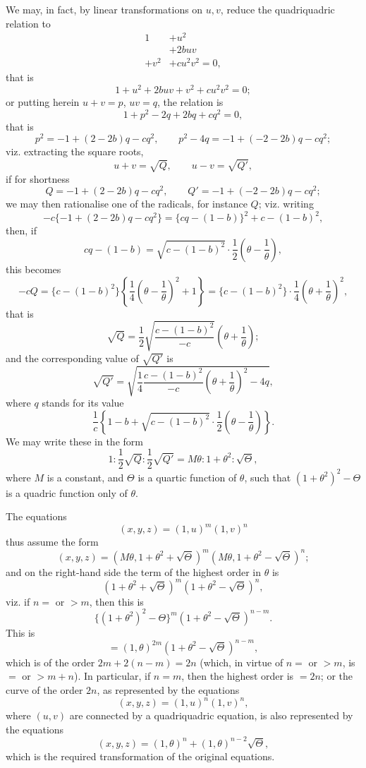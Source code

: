 \documentclass[11pt,a4paper]{article}
\begin{document}
We may, in fact, by linear transformations on $u,v$, reduce the quadriquadric relation to
\[
\begin{matrix}
1&+u^2\\
&+2buv\\
+v^2&+cu^2v^2=0,
\end{matrix}
\]
that is
\[
 1+u^2+2buv+v^2+cu^2v^2=0;
\]
or putting herein $u+v=p$, $uv=q$, the relation is
\[
 1+p^2-2q+2bq+cq^2=0,
\]
that is
\[
 p^2=-1+(2-2b)q-cq^2,\qquad
 p^2-4q=-1+(-2-2b)q-cq^2;
\]
viz. extracting the square roots,
\[
 u+v=\sqrt Q,\qquad u-v=\sqrt{Q'},
\]
if for shortness
\[
 Q=-1+(2-2b)q-cq^2,\qquad Q'=-1+(-2-2b)q-cq^2;
\]
we may then rationalise one of the radicals, for instance $Q$; viz. writing
\[
 -c\{-1+(2-2b)q-cq^2\}=\{cq-(1-b)\}^2+c-(1-b)^2,
\]
then, if
\[
 cq-(1-b)=\sqrt{c-(1-b)^2}\cdot\frac12\left(\theta-\frac{1}{\theta}\right),
\]
this becomes
\[
 -cQ=\{c-(1-b)^2\}
 \left\{\frac14\left(\theta-\frac{1}{\theta}\right)^2+1\right\}
 =\{c-(1-b)^2\}\cdot\frac14\left(\theta+\frac{1}{\theta}\right)^2,
\]
that is
\[
 \sqrt Q=\frac12\sqrt{\frac{c-(1-b)^2}{-c}}\left(\theta+\frac{1}{\theta}\right);
\]
and the corresponding value of $\sqrt{Q'}$ is
\[
 \sqrt{Q'}=
 \sqrt{\frac14\frac{c-(1-b)^2}{-c}\left(\theta+\frac{1}{\theta}\right)^2-4q},
\]
where $q$ stands for its value
\[
 \frac1c\left\{1-b+\sqrt{c-(1-b)^2}\cdot\frac12\left(\theta-\frac{1}{\theta}\right)\right\}.
\]
We may write these in the form
\[
 1:\frac12\sqrt Q:\frac12\sqrt{Q'}=M\theta:1+\theta^2:\sqrt\Theta,
\]
where $M$ is a constant, and $\Theta$ is a quartic function of $\theta$, such that
$(1+\theta^2)^2-\Theta$ is a quadric function only of $\theta$.

The equations
\[
 (x,y,z)=(1,u)^m(1,v)^n
\]
thus assume the form
\[
 (x,y,z)=(M\theta,1+\theta^2+\sqrt\Theta)^m
 (M\theta,1+\theta^2-\sqrt\Theta)^n;
\]
and on the right-hand side the term of the highest order in $\theta$ is
\[
 (1+\theta^2+\sqrt\Theta)^m(1+\theta^2-\sqrt\Theta)^n,
\]
viz. if $n=$ or $>m$, then this is
\[
 \{(1+\theta^2)^2-\Theta\}^m(1+\theta^2-\sqrt\Theta)^{n-m}.
\]
This is
\[
 =(1,\theta)^{2m}(1+\theta^2-\sqrt\Theta)^{n-m},
\]
which is of the order $2m+2(n-m)=2n$ (which, in virtue of $n=$ or $>m$, is $=$ or
$>m+n$). In particular, if $n=m$, then the highest order is $=2n$; or the curve of the
order $2n$, as represented by the equations
\[
 (x,y,z)=(1,u)^n(1,v)^n,
\]
where $(u,v)$ are connected by a quadriquadric equation, is also represented by the equations
\[
 (x,y,z)=(1,\theta)^n+(1,\theta)^{n-2}\sqrt\Theta,
\]
which is the required transformation of the original equations.
\end{document}
